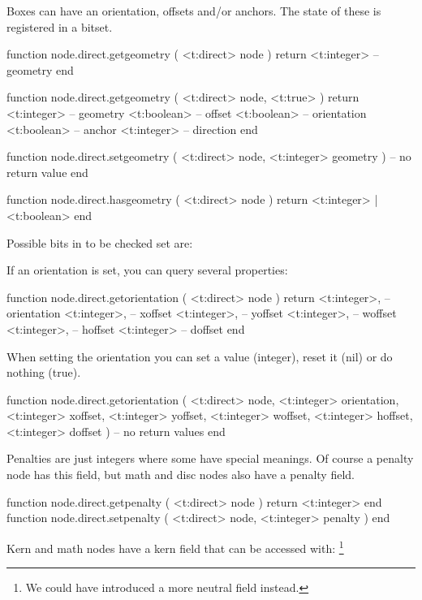Boxes can have an orientation, offsets and/or anchors. The state of these is
registered in a  bitset.

\starttyping[option=LUA]
function node.direct.getgeometry (
    <t:direct> node
)
    return <t:integer> -- geometry
end

function node.direct.getgeometry (
    <t:direct> node,
    <t:true>
)
    return
        <t:integer> -- geometry
        <t:boolean> -- offset
        <t:boolean> -- orientation
        <t:boolean> -- anchor
        <t:integer> -- direction
end

function node.direct.setgeometry (
    <t:direct>  node,
    <t:integer> geometry
)
    -- no return value
end

function node.direct.hasgeometry (
    <t:direct> node
)
    return <t:integer> | <t:boolean>
end
\stoptyping

Possible bits in to be checked set are:


If an orientation is set, you can query several properties:

\starttyping[option=LUA]
function node.direct.getorientation (
    <t:direct> node
)
    return
        <t:integer>, -- orientation
        <t:integer>, -- xoffset
        <t:integer>, -- yoffset
        <t:integer>, -- woffset
        <t:integer>, -- hoffset
        <t:integer>  -- doffset
end
\stoptyping

When setting the orientation you can set a value (integer),
reset it (nil) or do nothing (true).

\starttyping[option=LUA]
function node.direct.getorientation (
    <t:direct>  node,
    <t:integer> orientation,
    <t:integer> xoffset,
    <t:integer> yoffset,
    <t:integer> woffset,
    <t:integer> hoffset,
    <t:integer> doffset
)
    -- no return values
end
\stoptyping

\stopsubsection

\startsubsection[title={Kerns, glue and penalties}]

Penalties are just integers where some have special meanings. Of course a penalty
node has this field, but math and disc nodes also have a penalty field.

\starttyping[option=LUA]
function node.direct.getpenalty ( <t:direct> node ) return <t:integer> end
function node.direct.setpenalty ( <t:direct> node, <t:integer> penalty ) end
\stoptyping

Kern and math nodes have a kern field that can be accessed with: \footnote {We
could have introduced a more neutral  field instead.}

